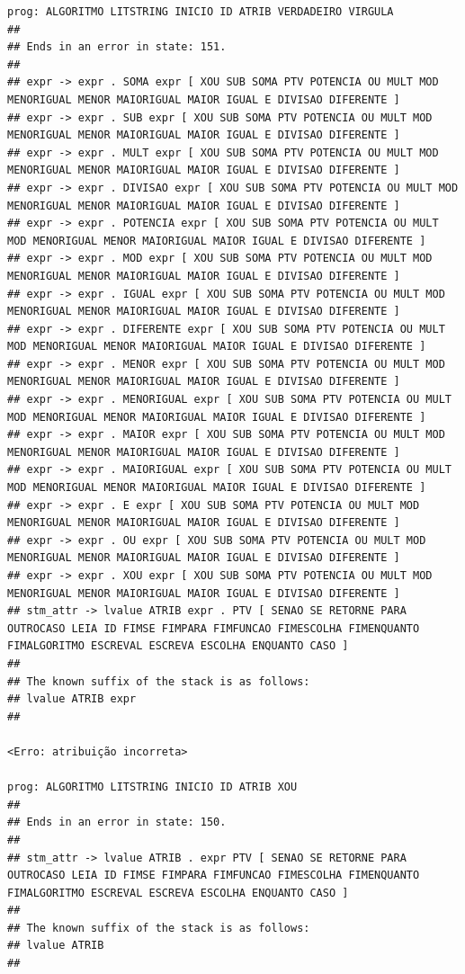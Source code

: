 \documentclass[hidelinks,12pt]{article}
\begin{document}
\begin{lstlisting}
prog: ALGORITMO LITSTRING INICIO ID ATRIB VERDADEIRO VIRGULA 
##
## Ends in an error in state: 151.
##
## expr -> expr . SOMA expr [ XOU SUB SOMA PTV POTENCIA OU MULT MOD MENORIGUAL MENOR MAIORIGUAL MAIOR IGUAL E DIVISAO DIFERENTE ]
## expr -> expr . SUB expr [ XOU SUB SOMA PTV POTENCIA OU MULT MOD MENORIGUAL MENOR MAIORIGUAL MAIOR IGUAL E DIVISAO DIFERENTE ]
## expr -> expr . MULT expr [ XOU SUB SOMA PTV POTENCIA OU MULT MOD MENORIGUAL MENOR MAIORIGUAL MAIOR IGUAL E DIVISAO DIFERENTE ]
## expr -> expr . DIVISAO expr [ XOU SUB SOMA PTV POTENCIA OU MULT MOD MENORIGUAL MENOR MAIORIGUAL MAIOR IGUAL E DIVISAO DIFERENTE ]
## expr -> expr . POTENCIA expr [ XOU SUB SOMA PTV POTENCIA OU MULT MOD MENORIGUAL MENOR MAIORIGUAL MAIOR IGUAL E DIVISAO DIFERENTE ]
## expr -> expr . MOD expr [ XOU SUB SOMA PTV POTENCIA OU MULT MOD MENORIGUAL MENOR MAIORIGUAL MAIOR IGUAL E DIVISAO DIFERENTE ]
## expr -> expr . IGUAL expr [ XOU SUB SOMA PTV POTENCIA OU MULT MOD MENORIGUAL MENOR MAIORIGUAL MAIOR IGUAL E DIVISAO DIFERENTE ]
## expr -> expr . DIFERENTE expr [ XOU SUB SOMA PTV POTENCIA OU MULT MOD MENORIGUAL MENOR MAIORIGUAL MAIOR IGUAL E DIVISAO DIFERENTE ]
## expr -> expr . MENOR expr [ XOU SUB SOMA PTV POTENCIA OU MULT MOD MENORIGUAL MENOR MAIORIGUAL MAIOR IGUAL E DIVISAO DIFERENTE ]
## expr -> expr . MENORIGUAL expr [ XOU SUB SOMA PTV POTENCIA OU MULT MOD MENORIGUAL MENOR MAIORIGUAL MAIOR IGUAL E DIVISAO DIFERENTE ]
## expr -> expr . MAIOR expr [ XOU SUB SOMA PTV POTENCIA OU MULT MOD MENORIGUAL MENOR MAIORIGUAL MAIOR IGUAL E DIVISAO DIFERENTE ]
## expr -> expr . MAIORIGUAL expr [ XOU SUB SOMA PTV POTENCIA OU MULT MOD MENORIGUAL MENOR MAIORIGUAL MAIOR IGUAL E DIVISAO DIFERENTE ]
## expr -> expr . E expr [ XOU SUB SOMA PTV POTENCIA OU MULT MOD MENORIGUAL MENOR MAIORIGUAL MAIOR IGUAL E DIVISAO DIFERENTE ]
## expr -> expr . OU expr [ XOU SUB SOMA PTV POTENCIA OU MULT MOD MENORIGUAL MENOR MAIORIGUAL MAIOR IGUAL E DIVISAO DIFERENTE ]
## expr -> expr . XOU expr [ XOU SUB SOMA PTV POTENCIA OU MULT MOD MENORIGUAL MENOR MAIORIGUAL MAIOR IGUAL E DIVISAO DIFERENTE ]
## stm_attr -> lvalue ATRIB expr . PTV [ SENAO SE RETORNE PARA OUTROCASO LEIA ID FIMSE FIMPARA FIMFUNCAO FIMESCOLHA FIMENQUANTO FIMALGORITMO ESCREVAL ESCREVA ESCOLHA ENQUANTO CASO ]
##
## The known suffix of the stack is as follows:
## lvalue ATRIB expr 
##

<Erro: atribuição incorreta>

prog: ALGORITMO LITSTRING INICIO ID ATRIB XOU 
##
## Ends in an error in state: 150.
##
## stm_attr -> lvalue ATRIB . expr PTV [ SENAO SE RETORNE PARA OUTROCASO LEIA ID FIMSE FIMPARA FIMFUNCAO FIMESCOLHA FIMENQUANTO FIMALGORITMO ESCREVAL ESCREVA ESCOLHA ENQUANTO CASO ]
##
## The known suffix of the stack is as follows:
## lvalue ATRIB 
##


\end{lstlisting}
\end{document}
